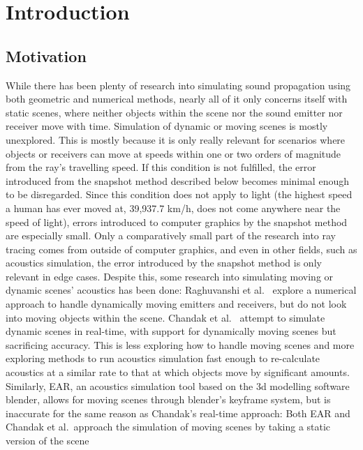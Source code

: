 \chapter{Introduction}

\section{Motivation}

While there has been plenty of research into simulating sound propagation using both geometric and numerical methods,
nearly all of it only concerns itself with static scenes,
where neither objects within the scene nor the sound emitter nor receiver move with time.
\newline
Simulation of dynamic or moving scenes is mostly unexplored.
This is mostly because it is only really relevant for scenarios
where objects or receivers can move at speeds within one or two orders of magnitude from the ray's travelling speed.
If this condition is not fulfilled,
the error introduced from the snapshot method described below becomes minimal enough to be disregarded.
Since this condition does not apply to light
(the highest speed a human has ever moved at, 39,937.7 km/h, does not come anywhere near the speed of light),
errors introduced to computer graphics by the snapshot method are especially small.
Only a comparatively small part of the research into ray tracing comes from outside of computer graphics,
and even in other fields, such as acoustics simulation,
the error introduced by the snapshot method is only relevant in edge cases.
Despite this, some research into simulating moving or dynamic scenes' acoustics has been done:
Raghuvanshi et al.~\cite{RS10} explore a numerical approach to handle dynamically moving emitters and receivers,
but do not look into moving objects within the scene.
Chandak et al.~\cite{Cha08} attempt to simulate dynamic scenes in real-time,
with support for dynamically moving scenes but sacrificing accuracy.
This is less exploring how to handle moving scenes
and more exploring methods to run acoustics simulation fast enough
to re-calculate acoustics at a similar rate to that at which objects move by significant amounts.
Similarly, EAR, an acoustics simulation tool based on the 3d modelling software blender,
allows for moving scenes through blender's keyframe system,
but is inaccurate for the same reason as Chandak's real-time approach:
\newline
Both EAR and Chandak et al.\ approach the simulation of moving scenes by taking a static version of the scene
